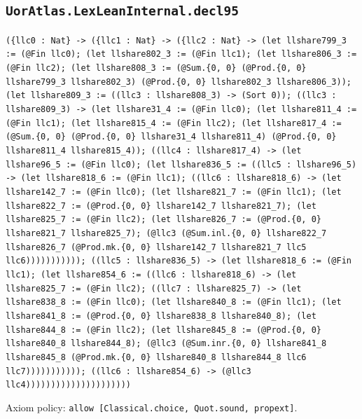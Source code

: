 \documentclass[11pt]{article}
\begin{document}
\subsection*{\texttt{UorAtlas.LexLeanInternal.decl95}}
\noindent\texttt{(\{llc0 : Nat\} -> (\{llc1 : Nat\} -> (\{llc2 : Nat\} -> (let llshare799\_3 := (@Fin llc0); (let llshare802\_3 := (@Fin llc1); (let llshare806\_3 := (@Fin llc2); (let llshare808\_3 := (@Sum.\{0, 0\} (@Prod.\{0, 0\} llshare799\_3 llshare802\_3) (@Prod.\{0, 0\} llshare802\_3 llshare806\_3)); (let llshare809\_3 := ((llc3 : llshare808\_3) -> (Sort 0)); ((llc3 : llshare809\_3) -> (let llshare31\_4 := (@Fin llc0); (let llshare811\_4 := (@Fin llc1); (let llshare815\_4 := (@Fin llc2); (let llshare817\_4 := (@Sum.\{0, 0\} (@Prod.\{0, 0\} llshare31\_4 llshare811\_4) (@Prod.\{0, 0\} llshare811\_4 llshare815\_4)); ((llc4 : llshare817\_4) -> (let llshare96\_5 := (@Fin llc0); (let llshare836\_5 := ((llc5 : llshare96\_5) -> (let llshare818\_6 := (@Fin llc1); ((llc6 : llshare818\_6) -> (let llshare142\_7 := (@Fin llc0); (let llshare821\_7 := (@Fin llc1); (let llshare822\_7 := (@Prod.\{0, 0\} llshare142\_7 llshare821\_7); (let llshare825\_7 := (@Fin llc2); (let llshare826\_7 := (@Prod.\{0, 0\} llshare821\_7 llshare825\_7); (@llc3 (@Sum.inl.\{0, 0\} llshare822\_7 llshare826\_7 (@Prod.mk.\{0, 0\} llshare142\_7 llshare821\_7 llc5 llc6))))))))))); ((llc5 : llshare836\_5) -> (let llshare818\_6 := (@Fin llc1); (let llshare854\_6 := ((llc6 : llshare818\_6) -> (let llshare825\_7 := (@Fin llc2); ((llc7 : llshare825\_7) -> (let llshare838\_8 := (@Fin llc0); (let llshare840\_8 := (@Fin llc1); (let llshare841\_8 := (@Prod.\{0, 0\} llshare838\_8 llshare840\_8); (let llshare844\_8 := (@Fin llc2); (let llshare845\_8 := (@Prod.\{0, 0\} llshare840\_8 llshare844\_8); (@llc3 (@Sum.inr.\{0, 0\} llshare841\_8 llshare845\_8 (@Prod.mk.\{0, 0\} llshare840\_8 llshare844\_8 llc6 llc7))))))))))); ((llc6 : llshare854\_6) -> (@llc3 llc4)))))))))))))))))))))}\par
\noindent Axiom policy: \texttt{allow [Classical.choice, Quot.sound, propext]}.\par
\end{document}
